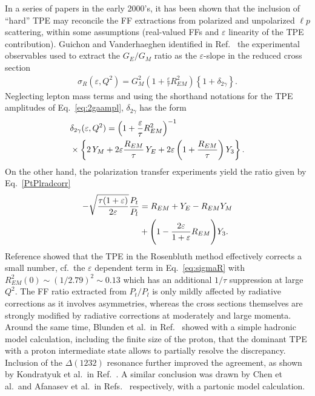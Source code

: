 In a series of papers in the early 2000's, it has been shown that the inclusion of ``hard'' TPE may reconcile the FF extractions from polarized and unpolarized $\ell p$ scattering, within some assumptions (real-valued FFs and  $\varepsilon$ linearity of the TPE contribution). Guichon and Vanderhaeghen identified in Ref.~\cite{Guichon:2003qm} the experimental observables used to extract the $G_E/G_M$ ratio as the $\varepsilon$-slope in the reduced cross section
\begin{align}
\sigma_R(\varepsilon, Q^2)
= G_{M}^2 \left(1 + \frac{\varepsilon}{\tau}  
R_{EM}^2 \right) \left\{ 1 + \delta_{2 \gamma}\right\} .
\label{eq:sigmaR}
\end{align}
Neglecting lepton mass terms and using the shorthand notations for the TPE amplitudes of 
Eq.~\ref{eq:2gaampl}, $\delta_{2\gamma}$ 
has the form
\begin{align}
&\delta_{2 \gamma}(\varepsilon, Q^2) = \left(1 + \frac{\varepsilon}{\tau}  R_{EM}^2 \right)^{-1} 
\nonumber \\ &
\times \left\{ 2 \, Y_M
+ 2 \varepsilon  \frac{R_{EM}}{\tau} \, Y_E + 2 \varepsilon \left( 1 + \frac{R_{EM}}{\tau} \right) Y_3 \right\}.
\label{crossen} 
\end{align} 
On the other hand, the polarization transfer experiments yield the ratio given by Eq.~\ref{PtPlradcorr}
\begin{align}
-\sqrt{\frac{\tau (1+\varepsilon)}{2\varepsilon}}  \frac{P_t}{P_l}&= R_{EM} +Y_E - R_{EM} Y_M \nn\\&  +\Bigg (1-\frac{2 \varepsilon}{1+\varepsilon} R_{EM} \Bigg )Y_3.
\eqlab{Rratios}
\end{align}
Reference \cite{Guichon:2003qm} showed that the TPE in the Rosenbluth method effectively corrects a small number, cf.\ the 
$\varepsilon$ dependent term in Eq.~\ref{eq:sigmaR} with $R_{EM}^2(0)\sim (1/2.79)^2 \sim 0.13$ which has an additional $1/\tau$ suppression at large $Q^2$. The FF ratio extracted from $P_t/P_l$ is only mildly affected by radiative corrections as it involves asymmetries,  whereas the cross sections themselves are strongly modified by radiative corrections at moderately and large momenta.  
Around the same time, Blunden et al.\  in Ref.~\cite{Blunden:2003sp} showed with a simple hadronic model calculation, including the finite size of the proton, that the dominant TPE with a proton intermediate state allows to partially resolve the discrepancy.
Inclusion of the $\Delta(1232)$ resonance further improved the agreement, as shown by Kondratyuk et al.\ in Ref.~\cite{Kondratyuk:2005kk}. A similar conclusion was drawn by Chen et al.\ and Afanasev et al.\ in Refs.~\cite{Chen:2004tw,Afanasev:2005prd} respectively, with a partonic model calculation. 


